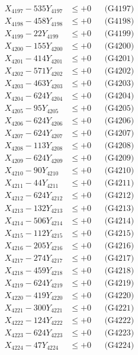 \documentclass[a4paper,10pt]{article}
\begin{document}
{\begin{align}
X_{4197} - 535Y_{4197} &\leq +0 && \text{(G4197)} \\
X_{4198} - 458Y_{4198} &\leq +0 && \text{(G4198)} \\
X_{4199} - 22Y_{4199} &\leq +0 && \text{(G4199)} \\
X_{4200} - 155Y_{4200} &\leq +0 && \text{(G4200)} \\
\allowbreak
X_{4201} - 414Y_{4201} &\leq +0 && \text{(G4201)} \\
X_{4202} - 571Y_{4202} &\leq +0 && \text{(G4202)} \\
X_{4203} - 463Y_{4203} &\leq +0 && \text{(G4203)} \\
X_{4204} - 624Y_{4204} &\leq +0 && \text{(G4204)} \\
X_{4205} - 95Y_{4205} &\leq +0 && \text{(G4205)} \\
X_{4206} - 624Y_{4206} &\leq +0 && \text{(G4206)} \\
X_{4207} - 624Y_{4207} &\leq +0 && \text{(G4207)} \\
X_{4208} - 113Y_{4208} &\leq +0 && \text{(G4208)} \\
X_{4209} - 624Y_{4209} &\leq +0 && \text{(G4209)} \\
X_{4210} - 90Y_{4210} &\leq +0 && \text{(G4210)} \\
\allowbreak
X_{4211} - 44Y_{4211} &\leq +0 && \text{(G4211)} \\
X_{4212} - 624Y_{4212} &\leq +0 && \text{(G4212)} \\
X_{4213} - 132Y_{4213} &\leq +0 && \text{(G4213)} \\
X_{4214} - 506Y_{4214} &\leq +0 && \text{(G4214)} \\
X_{4215} - 112Y_{4215} &\leq +0 && \text{(G4215)} \\
X_{4216} - 205Y_{4216} &\leq +0 && \text{(G4216)} \\
X_{4217} - 274Y_{4217} &\leq +0 && \text{(G4217)} \\
X_{4218} - 459Y_{4218} &\leq +0 && \text{(G4218)} \\
X_{4219} - 624Y_{4219} &\leq +0 && \text{(G4219)} \\
X_{4220} - 419Y_{4220} &\leq +0 && \text{(G4220)} \\
\allowbreak
X_{4221} - 300Y_{4221} &\leq +0 && \text{(G4221)} \\
X_{4222} - 124Y_{4222} &\leq +0 && \text{(G4222)} \\
X_{4223} - 624Y_{4223} &\leq +0 && \text{(G4223)} \\
X_{4224} - 47Y_{4224} &\leq +0 && \text{(G4224)} \\

\end{align}}
\end{document}
